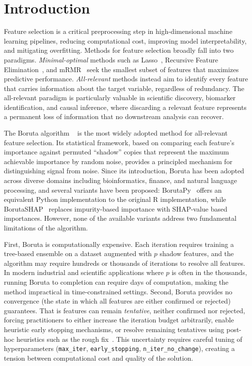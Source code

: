 \documentclass[runningheads]{llncs}
\begin{document}
\section{Introduction}
\label{sec:introduction}

Feature selection is a critical preprocessing step in high-dimensional machine learning pipelines, reducing computational cost, improving model interpretability, and mitigating overfitting. Methods for feature selection broadly fall into two paradigms. \emph{Minimal-optimal} methods such as Lasso~\cite{tibshirani1996lasso}, Recursive Feature Elimination~\cite{guyon2002rfe}, and mRMR~\cite{peng2005mrmr} seek the smallest subset of features that maximizes predictive performance. \emph{All-relevant} methods instead aim to identify every feature that carries information about the target variable, regardless of redundancy. The all-relevant paradigm is particularly valuable in scientific discovery, biomarker identification, and causal inference, where discarding a relevant feature represents a permanent loss of information that no downstream analysis can recover.

The Boruta algorithm ~\cite{kursa2010feature}  is the most widely adopted method for all-relevant feature selection. Its statistical framework, based on comparing each feature's importance against permuted ``shadow'' copies that represent the maximum achievable importance by random noise, provides a principled mechanism for distinguishing signal from noise. Since its introduction, Boruta has been adopted across diverse domains including bioinformatics, finance, and natural language processing, and several variants have been proposed: BorutaPy~\cite{borutapy} offers an equivalent Python implementation to the original R implementation, while BorutaSHAP~\cite{borutashap} replaces impurity-based importance with SHAP-value based importances. However, none of the available variants address two fundamental limitations of the algorithm. 

First, Boruta is computationally expensive. Each iteration requires training a tree-based ensemble on a dataset augmented with $p$ shadow features, and the algorithm may require hundreds or thousands of iterations to resolve all features. In modern industrial and scientific applications where $p$ is often in the thousands, running Boruta to completion can require days of computation, making the method impractical in time-constrained settings. Second, Boruta provides no convergence (the state in which all features are either confirmed or rejected) guarantees. That is features can remain \emph{tentative}, neither confirmed nor rejected, forcing practitioners to either increase the iteration budget arbitrarily, enable heuristic early stopping mechanisms, or resolve remaining tentatives using post-hoc heuristics such as the rough fix~\cite{kursa2010feature}. This uncertainty requires careful tuning of hyperparameters (\texttt{max\_iter}, \texttt{early\_stopping}, \texttt{n\_iter\_no\_change}), creating a tension between computational cost and quality of the solution.
\end{document}
